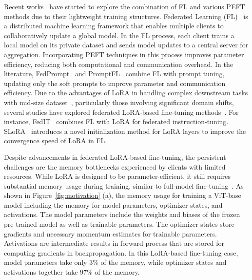 \documentclass[lettersize,journal]{IEEEtran}
\newcommand{\ping}[1]{\textcolor{magenta}{#1}}
\begin{document}
Recent works~\cite{zhao2023fedprompt,guo2023promptfl,zhang2023towards,babakniya2023slora,sun2024improving} have started to explore the combination of FL and various PEFT methods due to their lightweight training structures. 
%
{Federated Learning (FL)~\cite{konecny2016federated,zawad2025fedcust} is a distributed machine learning framework that enables multiple clients to collaboratively update a global model.}
%
%
%
In the FL process, each client trains a local model on its private dataset and sends model updates to a central server for aggregation. Incorporating PEFT techniques in this process improves parameter efficiency, reducing both computational and communication overhead.
In the literature,
FedPrompt~\cite{zhao2023fedprompt} and PromptFL~\cite{guo2023promptfl} combine FL with prompt tuning, updating only the soft prompts to improve parameter and communication efficiency. Due to the advantages of LoRA in handling complex downstream tasks with mid-size dataset~\cite{zhang2023fedpetuning}, particularly those involving significant domain shifts, several studies have explored federated LoRA-based fine-tuning methods~\cite{zhang2023towards,babakniya2023slora}. 
{For instance, FedIT~\cite{zhang2023towards} combines FL with LoRA for federated instruction-tuning. SLoRA~\cite{babakniya2023slora} introduces a novel initialization method for LoRA layers to improve the convergence speed of LoRA in FL.}

Despite advancements in federated LoRA-based fine-tuning, the persistent challenges are the memory bottlenecks experienced by clients with limited resources.
While LoRA is designed to be parameter-efficient, it still requires substantial memory usage
during training, similar to full-model fine-tuning~\cite{li2023fedtp}. 
As shown in Figure~\ref{fig:motivation} (a), the memory usage for training a ViT-base~\cite{krizhevsky2009learning} model
including the memory for model parameters, optimizer states, and activations. The model parameters include the weights and biases of the frozen pre-trained model as well as trainable parameters.
The optimizer states store gradients and necessary momentum estimates for trainable parameters.
Activations are intermediate results in forward process that are stored for computing gradients in backpropagation. In this LoRA-based fine-tuning case, model parameters take only 3\% of the memory, while optimizer states and activations together take 97\% of the memory.
\end{document}
